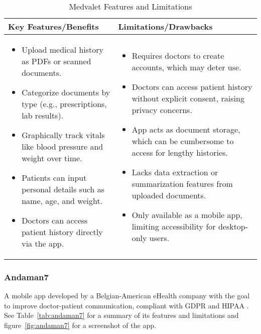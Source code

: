 \begin{table}[h!]
\centering
    \begin{tabular}{|p{}|p{}|}
    \hline
    \textbf{Key Features/Benefits} & \textbf{Limitations/Drawbacks} \\ \hline
    \begin{itemize}
        \item Upload medical history as PDFs or scanned documents.
        \item Categorize documents by type (e.g., prescriptions, lab results).
        \item Graphically track vitals like blood pressure and weight over time.
        \item Patients can input personal details such as name, age, and weight.
        \item Doctors can access patient history directly via the app.
    \end{itemize} &
    \begin{itemize}
        \item Requires doctors to create accounts, which may deter use.
        \item Doctors can access patient history without explicit consent, raising privacy concerns.
        \item App acts as document storage, which can be cumbersome to access for lengthy histories.
        \item Lacks data extraction or summarization features from uploaded documents.
        \item Only available as a mobile app, limiting accessibility for desktop-only users.
    \end{itemize} \\ \hline
    \end{tabular}
\caption{Medvalet Features and Limitations}\label{tab:medvalet}
\end{table}

\FloatBarrier{}

\subsubsection{Andaman7}

A mobile app developed by a Belgian-American eHealth company with the goal to improve doctor-patient communication, compliant with GDPR and HIPAA \parencite{andaman}. See Table~\ref{tab:andaman7} for a summary of its features and limitations and figure~\ref{fig:andaman7} for a screenshot of the app.

